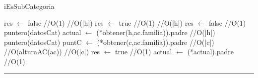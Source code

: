 \begin{algorithm}[H]
\caption{iEsSubCategoria}
\begin{algorithmic}[1]
\state res $\gets$ false \hfill //O(1)
 \hfill //O(|h|)
\state res $\gets$ true \hfill //O(1)
\Else
{} \hfill //O(|h|)
\state res $\gets$ false \hfill //O(1)
\Else
\state puntero(datosCat) actual $\gets$ (*obtener(h,ac.familia)).padre \hfill //O(|h|)
\state puntero(datosCat) puntC $\gets$ (*obtener(c,ac.familia)).padre \hfill //O(|c|)
 \hfill //O(alturaAC(ac))
 \hfill //O(|c|)
\state res $\gets$ true \hfill //O(1)
\Else
\state actual $\gets$ (*actual).padre \hfill //O(1)
\endif
\endwhile
\endif
\endif
\EndFunction 
\end{algorithmic}
\hrule
{}
\end{algorithm}